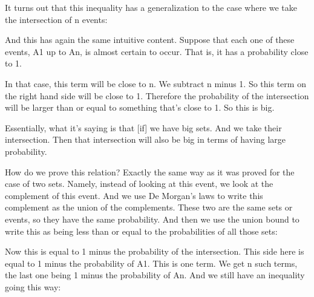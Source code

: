 \documentclass[pdftex, brazil, 12pt, twoside]{article}
\begin{document}
It turns out that this inequality has a
generalization to the case where we take the intersection
of n events:

\begin{figure}[H]
  \begin{center}
  \end{center}
\end{figure}

And this has again the same intuitive content.
Suppose that each one of these events, A1 up to An, is almost
certain to occur.
That is, it has a probability close to 1.

In that case, this term will be close to n.
We subtract n minus 1.
So this term on the right hand side will be close to 1.
Therefore the probability of the intersection will be
larger than or equal to something that's close to 1.
So this is big.

Essentially, what it's saying is that [if] we have big sets.
And we take their intersection.
Then that intersection will also be big in terms of having
large probability.

How do we prove this relation?
Exactly the same way as it was proved for
the case of two sets.
Namely, instead of looking at this event, we look at the
complement of this event.
And we use De Morgan's laws to write this complement as the
union of the complements.
These two are the same sets or events, so they have the same
probability.
And then we use the union bound to write this as being
less than or equal to the probabilities
of all those sets:

\begin{figure}[H]
  \begin{center}
  \end{center}
\end{figure}

Now this is equal to 1 minus the probability of the
intersection.
This side here is equal to 1 minus the probability of A1.
This is one term.
We get n such terms, the last one being 1 minus the
probability of An.
And we still have an inequality going this way:
\end{document}
